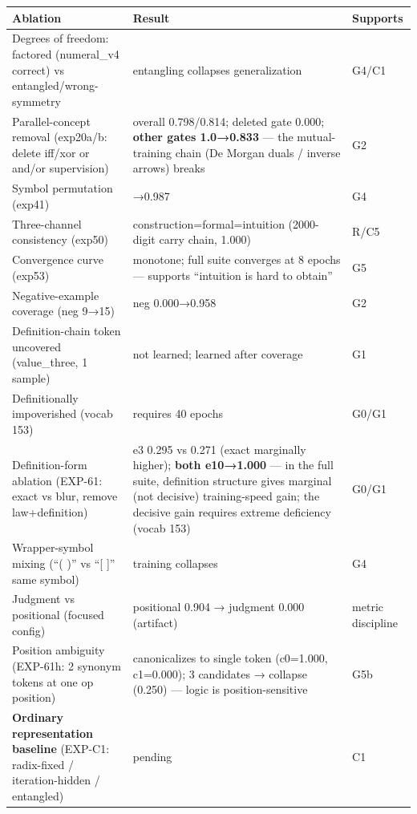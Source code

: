 \documentclass[
]{article}
\begin{document}
\begin{longtable}[]{@{}
  >{\raggedright\arraybackslash}p{}
  >{\raggedright\arraybackslash}p{}
  >{\raggedright\arraybackslash}p{}@{}}
\toprule\noalign{}
\begin{minipage}[b]{\linewidth}\raggedright
Ablation
\end{minipage} & \begin{minipage}[b]{\linewidth}\raggedright
Result
\end{minipage} & \begin{minipage}[b]{\linewidth}\raggedright
Supports
\end{minipage} \\
\midrule\noalign{}
\endhead
\bottomrule\noalign{}
\endlastfoot
Degrees of freedom: factored (numeral\_v4 correct) vs
entangled/wrong-symmetry & entangling collapses generalization &
G4/C1 \\
Parallel-concept removal (exp20a/b: delete iff/xor or and/or
supervision) & overall 0.798/0.814; deleted gate 0.000; \textbf{other
gates 1.0→0.833} --- the mutual-training chain (De Morgan duals /
inverse arrows) breaks & G2 \\
Symbol permutation (exp41) & 0.996→0.987 & G4 \\
Three-channel consistency (exp50) & construction=formal=intuition
(2000-digit carry chain, 1.000) & R/C5 \\
Convergence curve (exp53) & monotone; full suite converges at 8 epochs
--- supports ``intuition is hard to obtain'' & G5 \\
Negative-example coverage (neg 9→15) & neg 0.000→0.958 & G2 \\
Definition-chain token uncovered (value\_three, 1 sample) & not learned;
learned after coverage & G1 \\
Definitionally impoverished (vocab 153) & requires 40 epochs & G0/G1 \\
Definition-form ablation (EXP-61: exact vs blur, remove law+definition)
& e3 0.295 vs 0.271 (exact marginally higher); \textbf{both e10→1.000}
--- in the full suite, definition structure gives marginal (not
decisive) training-speed gain; the decisive gain requires extreme
deficiency (vocab 153) & G0/G1 \\
Wrapper-symbol mixing (``( )'' vs ``{[} {]}'' same symbol) & training
collapses & G4 \\
Judgment vs positional (focused config) & positional 0.904 → judgment
0.000 (artifact) & metric discipline \\
Position ambiguity (EXP-61h: 2 synonym tokens at one op position) &
canonicalizes to single token (c0=1.000, c1=0.000); 3 candidates →
collapse (0.250) --- logic is position-sensitive & G5b \\
\textbf{Ordinary representation baseline} (EXP-C1: radix-fixed /
iteration-hidden / entangled) & pending & C1 \\
\end{longtable}
\end{document}
